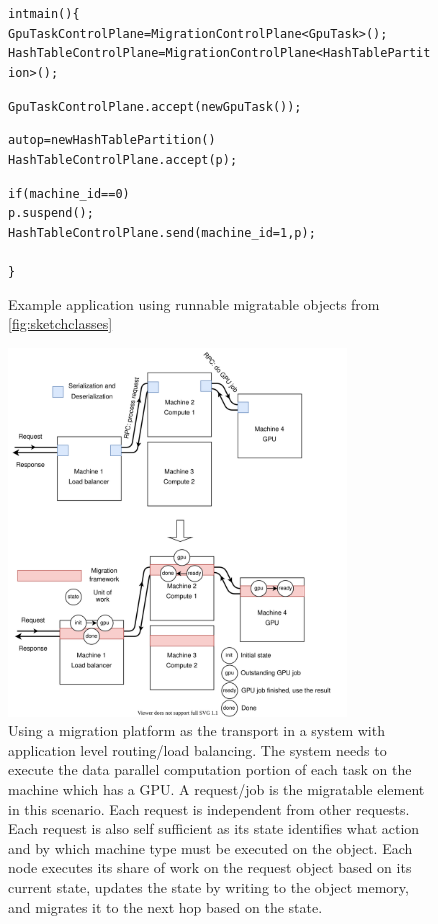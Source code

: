 \begin{figure}[t]
\begin{alltt}
int main() \{
    GpuTaskControlPlane = MigrationControlPlane<GpuTask>();
    HashTableControlPlane = MigrationControlPlane<HashTablePartition>();

    GpuTaskControlPlane.accept(new GpuTask());

    auto p = new HashTablePartition()
    HashTableControlPlane.accept(p);

    if(machine_id == 0) {
        p.suspend();
        HashTableControlPlane.send(machine_id=1, p);
    }
\}


\end{alltt}
\caption{
    Example application using runnable migratable objects from \autoref{fig:sketchclasses}
}
\label{fig:sketchmain}
\end{figure}



\begin{figure}[t]
\centering

\includegraphics[width=0.8\textwidth]{migration-transport.drawio}
\caption{
    Using a migration platform as the transport in a system with
    application level routing/load balancing. The system needs to execute
    the data parallel computation portion of each task on the machine
    which has a GPU. A request/job is the
    migratable element in this scenario. Each request is independent
    from other requests. Each request is also self sufficient as its
    state identifies what action and by which machine type must be
    executed on the object. Each node executes its share of work
    on the request object based on its current state, updates the state by
    writing to the object memory, and migrates it to the next hop based
    on the state.
}
\label{fig:migrationtransport}
\end{figure}
